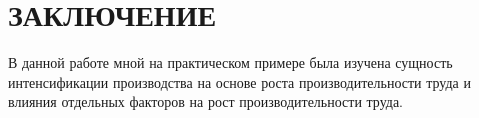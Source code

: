 \section*{ЗАКЛЮЧЕНИЕ}

В данной работе мной на практическом примере была изучена сущность интенсификации производства на основе роста
производительности труда и влияния отдельных факторов на рост производительности труда.

\newpage
